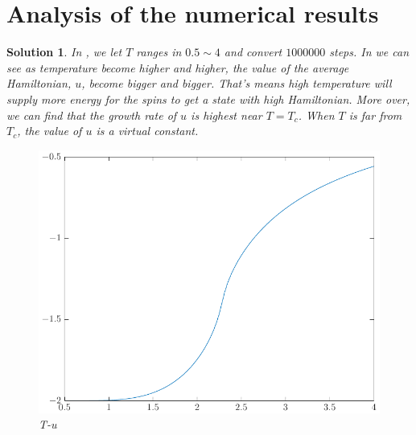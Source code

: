 \documentclass[11pt,openany]{book}              %
\newtheorem{solution}{Solution}
\begin{document}
\section{Analysis of the numerical results }
\begin{solution}
	In , we let \(T\) ranges in \(0.5\sim 4\) and convert \(1000000\) steps.
	In  we can see as temperature become higher and higher, the value of the average Hamiltonian, \(u\), become bigger and bigger.
	That's means high temperature will supply more energy for the spins to get a state with high Hamiltonian.
	More over, we can find that the growth rate of \(u\) is highest near \(T=T_c\).
	When \(T\) is far from \(T_c\), the value of \(u\) is a virtual constant.
	\begin{figure}\label{fig:Tu}
		\centering
		\includegraphics[width=0.8\linewidth]{Tu.pdf}
		\caption{T-u}
	\end{figure}


\end{solution}
\end{document}
